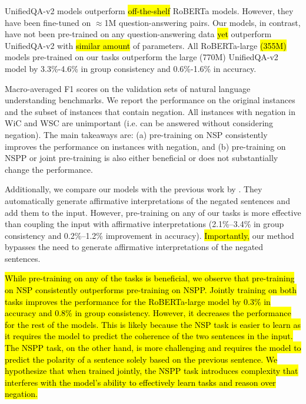 {UnifiedQA-v2} \cite{khashabi2022unifiedqav2} models outperform \hl{off-the-shelf} {RoBERTa} models. 
However, they have been fine-tuned on $\approx$1M question-answering pairs. 
Our models, in contrast, have not been pre-trained on any question-answering data \hl{yet} outperform {UnifiedQA-v2} with\hl{ similar amount} of parameters.
All {RoBERTa-large} \hl{(355M)} models pre-trained on our tasks outperform the large (770M) {UnifiedQA-v2} model by 3.3\%-4.6\% in group consistency and 0.6\%-1.6\% in accuracy.

\begin{table*}[t]
    \centering
    
    \caption{
        Macro-averaged F1 scores on the validation sets of natural language understanding benchmarks.
        We report the performance on the original instances and the subset of instances that contain negation.
        All instances with negation in WiC and WSC are unimportant (i.e. can be answered without considering negation).
        The main takeaways are: (a) pre-training on NSP consistently improves the performance on instances with negation, and
        (b) pre-training on NSPP or joint pre-training is also either beneficial or does not substantially change the performance.
        \label{tab:nluresults}
        }
\end{table*}

Additionally,
we compare our models with the previous work by \citet{rezaei2024paraphrasing}.
They automatically generate affirmative interpretations of the negated sentences and add them to the input.
However, pre-training on any of our tasks is more effective than coupling the input with affirmative interpretations
(2.1\%--3.4\% in group consistency and 0.2\%--1.2\% improvement in accuracy). 
\hl{Importantly, }
our method bypasses the need to generate affirmative interpretations of the negated sentences.

\hl{
While pre-training on any of the tasks is beneficial,
we observe that pre-training on NSP consistently outperforms pre-training on NSPP.
Jointly training on both tasks improves the performance for the RoBERTa-large model by 0.3\% in accuracy and 0.8\% in group consistency.
However, it decreases the performance for the rest of the models. 
This is likely because the NSP task is easier to learn as it requires the model to predict the coherence of the two sentences in the input.
The NSPP task, on the other hand, is more challenging and requires the model to predict the polarity of a sentence solely based on the previous sentence.
We hypothesize that when trained jointly, the NSPP task introduces complexity that interferes with the model's ability to effectively learn tasks and reason over negation.
}

